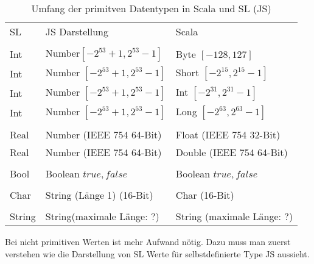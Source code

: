 \documentclass[12pt,a4paper]{report}
\begin{document}
\begin{table}
\caption{Umfang der primitven Datentypen in Scala und \ac{SL} (\ac{JS})}
\centering
\begin{tabular}{lll}
 \ac{SL} &    \ac{JS} Darstellung              &    Scala \\
\\
Int  &  Number\footnotemark $[-2^{53} + 1, 2^{53} -1]$   &  Byte  $[-128, 127]$\\
Int  &  Number $[-2^{53} + 1, 2^{53} -1]$   &  Short $[-2^{15}, 2^{15}-1]$\\
Int  & Number $[-2^{53} + 1, 2^{53} -1]$    & Int   $[-2^{31}, 2^{31}-1]$\\
Int  &  Number $[-2^{53} + 1, 2^{53} -1]$   &  Long  $[-2^{63}, 2^{63}-1]$\\
\\
Real &  Number (IEEE 754 64-Bit)      &  Float  (IEEE 754 32-Bit)\\
Real &  Number (IEEE 754 64-Bit)      &  Double (IEEE 754 64-Bit)\\
\\
Bool &  Boolean ${true, false}$         &  Boolean ${true, false}$\\
\\
Char &  String (Länge 1) (16-Bit)     &  Char (16-Bit)\\
\\
String& String\footnotemark (maximale Länge: ?)    &  String (maximale Länge: ?)\\
\end{tabular}
\label{tab:primitives-borders}
\end{table}


Bei nicht primitiven Werten ist mehr Aufwand nötig. Dazu muss man zuerst verstehen wie die Darstellung von \ac{SL} Werte für selbstdefinierte Type \ac{JS} aussieht.
\end{document}
